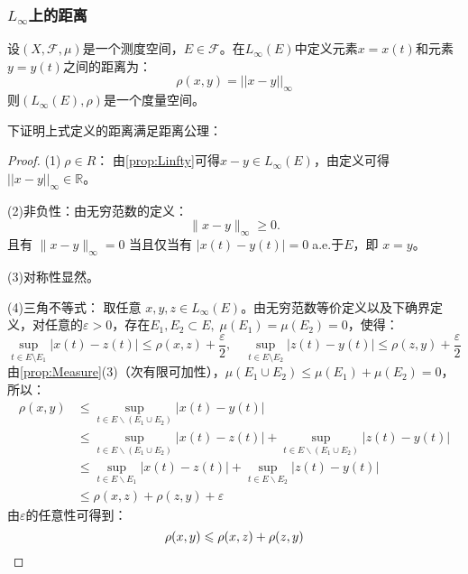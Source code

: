 \subsubsection{$L_{\infty}$上的距离}
\begin{definition}
	设$(X,\mathscr{F},\mu)$是一个测度空间，$E\in\mathscr{F}$。在$L_{\infty}(E)$中定义元素$x=x(t)$和元素$y=y(t)$之间的距离为：
	\begin{equation*}
		\rho(x,y)=||x-y||_\infty
	\end{equation*}
	则$(L_{\infty}(E),\rho)$是一个度量空间。
\end{definition}
下证明上式定义的距离满足距离公理：
\begin{proof}
	(1)$\;\rho\in R$： 由\cref{prop:Linfty}可得$x-y\in L_{\infty}(E)$，由定义可得$||x-y||_{\infty}\in\mathbb{R}$。\par
	(2)非负性：由无穷范数的定义：
	\begin{equation*}
		\|x-y\|_\infty \geqslant 0.
	\end{equation*}
	且有 \(\|x-y\|_\infty=0\) 当且仅当有 \(|x(t)-y(t)|=0\;\)a.e.于$E$，即 \(x=y\)。\par
	(3)对称性显然。\par
	(4)三角不等式：
	取任意 \(x,y,z\in L_{\infty}(E)\)。由无穷范数等价定义以及下确界定义，对任意的$\varepsilon>0$，存在$E_1,E_2\subset E,\;\mu(E_1)=\mu(E_2)=0$，使得：
	\begin{equation*}
		\sup_{t\in E\setminus E_1}|x(t)-z(t)|\leqslant \rho(x,z)+\frac{\varepsilon}{2},
		\quad
		\sup_{t\in E\setminus E_2}|z(t)-y(t)|\leqslant \rho(z,y)+\frac{\varepsilon}{2}
	\end{equation*}
	由\cref{prop:Measure}(3)（次有限可加性），$\mu(E_1\cup E_2)\leqslant\mu(E_1)+\mu(E_2)=0$，所以：
	\begin{align*}
		\rho(x,y)
		&\leqslant\sup_{t\in E\backslash(E_1\cup E_2)}|x(t)-y(t)| \\
		&\leqslant\sup_{t\in E\backslash(E_1\cup E_2)}|x(t)-z(t)|+\sup_{t\in E\backslash(E_1\cup E_2)}|z(t)-y(t)| \\
		&\leqslant\sup_{t\in E\backslash E_1}|x(t)-z(t)|+\sup_{t\in E\backslash E_2}|z(t)-y(t)| \\
		&\leqslant\rho(x,z)+\rho(z,y)+\varepsilon
	\end{align*}
	由$\varepsilon$的任意性可得到：
	\begin{equation*}
		\rho(x,y)\leqslant\rho(x,z)+\rho(z,y)\qedhere
	\end{equation*}
\end{proof}
